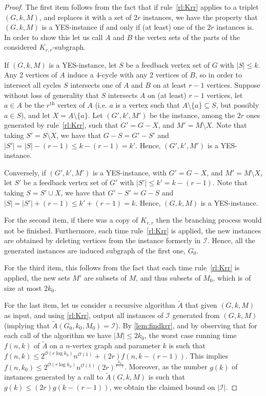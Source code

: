 \documentclass{amsart}
\newcommand{\I}{\mathcal{I}}
\newcommand{\ruleref}[1]{\hyperref[#1]{\ref*{#1}}}
\renewcommand{\O}{\mathcal{O}}
\begin{document}
\begin{proof}
The first item follows from the fact that if rule~\ruleref{rl:Krr} applies to a triplet $(G,k,M)$, and replaces it with a set of $2r$ instances, we have the property that $(G,k,M)$ is a YES-instance if and only if (at least) one of the $2r$ instances is. In order to show this let us call $A$ and $B$ the vertex sets of the parts of the considered $K_{r,r}$-subgraph.

If $(G,k,M)$ is a YES-instance, let $S$ be a feedback vertex set of $G$ with $|S|\le k$. Any 2 vertices of $A$ induce a 4-cycle with any 2 vertices of $B$, so in order to intersect all cycles $S$ intersects one of $A$ and $B$ on at least $r-1$ vertices. Suppose without loss of generality that $S$ intersects $A$ on (at least) $r-1$ vertices, let $a\in A$ be the $r^{\text{th}}$ vertex of $A$ (i.e. $a$ is a vertex such that $A\setminus\{a\} \subseteq S$, but possibly $a\in S$), and let $X=A\setminus \{a\}$. Let $(G',k',M')$ be the instance, among the $2r$ ones generated by rule~\ruleref{rl:Krr}, such that $G'=G -  X$, and $M'=M\setminus X$. Note that taking $S'=S\setminus X$, we have that $G -  S=G' -  S'$ and $|S'|=|S|-(r-1)\le k-(r-1)=k'$. Hence, $(G',k',M')$ is a YES-instance.

Conversely, if $(G',k',M')$ is a YES-instance, with $G'=G -  X$, and $M'=M\setminus X$, let $S'$ be a feedback vertex set of $G'$ with $|S'|\le k'=k-(r-1)$.
Note that taking $S=S' \cup X$, we have that $G' -  S' = G -  S$ and $|S|=|S'|+(r-1)\le k'+(r-1)=k$. Hence, $(G,k,M)$ is a YES-instance.

For the second item, if there was a copy of $K_{r,r}$ then the branching process would not be finished. Furthermore, each time rule~\ruleref{rl:Krr} is applied, the new instances are obtained by deleting vertices from the instance formerly in $\I$. Hence, all the generated instances are induced subgraph of the first one, $G_0$.

For the third item, this follows from the fact that each time rule~\ruleref{rl:Krr} is applied, the new sets $M'$ are subsets of $M$, and thus subsets of $M_0$, which is of size at most $2k_0$.

For the last item, let us consider a recursive algorithm $\tilde{A}$ that given $(G,k,M)$ as input, and using \ruleref{rl:Krr}, output all instances of $\I$ generated from $(G,k,M)$ (implying that $\tilde{A}(G_0,k_0,M_0)=\I$).
By \autoref{lem:findkrr}, and by observing that for each call of the algorithm we have $|M|\leq 2k_0$, the worst case running time $f(n,k)$ of $\tilde{A}$ on a $n$-vertex graph and parameter $k$ is such that $f(n,k) \le 2^{\O\left (r\log k_0 \right )}n^{\O(1)}+(2r) f(n,k-(r-1))$.
This implies $f(n,k_0) \le 2^{\O\left (r\log k_0 \right )}n^{\O(1)}(2r)^{\frac{k_0}{r-1}}$.
Moreover, as the number $g(k)$ of instances
generated by a call to $\tilde{A}(G,k,M)$ is such that $g(k) \le (2r) g(k-(r-1))$, we obtain the claimed bound on $|\I|$.
\end{proof}
\end{document}
